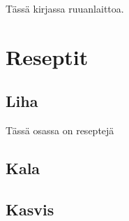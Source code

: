\documentclass[twosides, 11pt]{book}
\begin{document}
Tässä kirjassa ruuanlaittoa.

\part*{Reseptit}
\chapter*{Liha}
Tässä osassa on reseptejä


\chapter*{Kala}

\chapter*{Kasvis}
\end{document}

